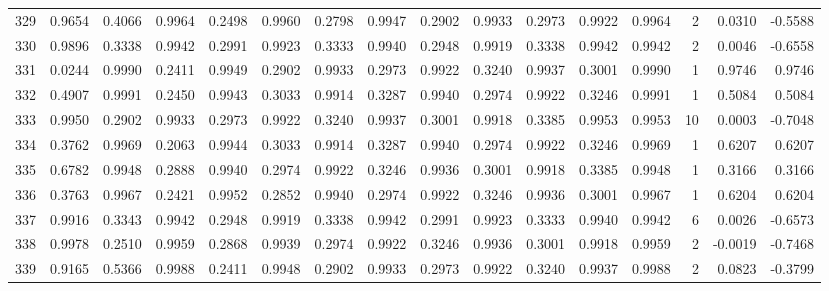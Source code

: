 \begin{tabular}{lrrrrrrrrrrrrrrr}
329 &      0.9654 &  0.4066 &  0.9964 &  0.2498 &  0.9960 &  0.2798 &  0.9947 &  0.2902 &  0.9933 &  0.2973 &   0.9922 &     0.9964 &      2 &                    0.0310 &                    -0.5588 \\
330 &      0.9896 &  0.3338 &  0.9942 &  0.2991 &  0.9923 &  0.3333 &  0.9940 &  0.2948 &  0.9919 &  0.3338 &   0.9942 &     0.9942 &      2 &                    0.0046 &                    -0.6558 \\
331 &      0.0244 &  0.9990 &  0.2411 &  0.9949 &  0.2902 &  0.9933 &  0.2973 &  0.9922 &  0.3240 &  0.9937 &   0.3001 &     0.9990 &      1 &                    0.9746 &                     0.9746 \\
332 &      0.4907 &  0.9991 &  0.2450 &  0.9943 &  0.3033 &  0.9914 &  0.3287 &  0.9940 &  0.2974 &  0.9922 &   0.3246 &     0.9991 &      1 &                    0.5084 &                     0.5084 \\
333 &      0.9950 &  0.2902 &  0.9933 &  0.2973 &  0.9922 &  0.3240 &  0.9937 &  0.3001 &  0.9918 &  0.3385 &   0.9953 &     0.9953 &     10 &                    0.0003 &                    -0.7048 \\
334 &      0.3762 &  0.9969 &  0.2063 &  0.9944 &  0.3033 &  0.9914 &  0.3287 &  0.9940 &  0.2974 &  0.9922 &   0.3246 &     0.9969 &      1 &                    0.6207 &                     0.6207 \\
335 &      0.6782 &  0.9948 &  0.2888 &  0.9940 &  0.2974 &  0.9922 &  0.3246 &  0.9936 &  0.3001 &  0.9918 &   0.3385 &     0.9948 &      1 &                    0.3166 &                     0.3166 \\
336 &      0.3763 &  0.9967 &  0.2421 &  0.9952 &  0.2852 &  0.9940 &  0.2974 &  0.9922 &  0.3246 &  0.9936 &   0.3001 &     0.9967 &      1 &                    0.6204 &                     0.6204 \\
337 &      0.9916 &  0.3343 &  0.9942 &  0.2948 &  0.9919 &  0.3338 &  0.9942 &  0.2991 &  0.9923 &  0.3333 &   0.9940 &     0.9942 &      6 &                    0.0026 &                    -0.6573 \\
338 &      0.9978 &  0.2510 &  0.9959 &  0.2868 &  0.9939 &  0.2974 &  0.9922 &  0.3246 &  0.9936 &  0.3001 &   0.9918 &     0.9959 &      2 &                   -0.0019 &                    -0.7468 \\
339 &      0.9165 &  0.5366 &  0.9988 &  0.2411 &  0.9948 &  0.2902 &  0.9933 &  0.2973 &  0.9922 &  0.3240 &   0.9937 &     0.9988 &      2 &                    0.0823 &                    -0.3799 \\

\end{tabular}
